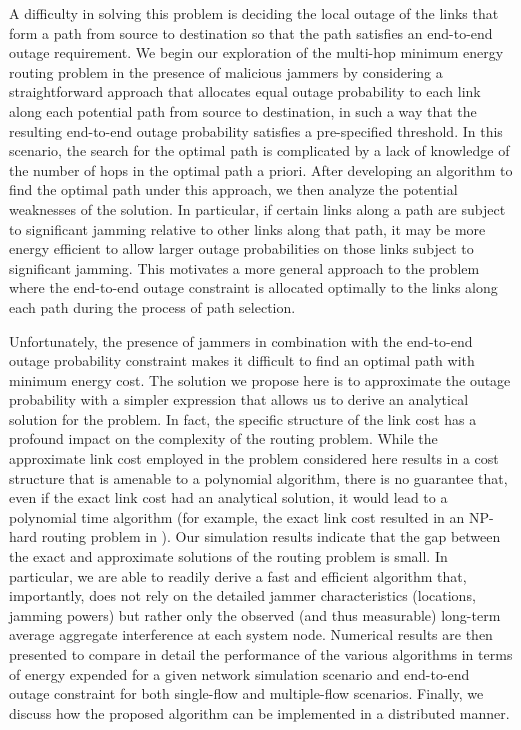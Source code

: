\documentclass[10pt,journal]{IEEEtran}
\theoremstyle{definition}
\begin{document}
A difficulty in solving this problem is deciding the local outage of
the links that form a path from source to destination so that the
path satisfies an end-to-end outage requirement. 
We begin our exploration of the multi-hop minimum energy routing problem in the presence of malicious jammers by considering a straightforward approach that allocates equal outage probability to each link along each potential path from source to destination, in such a way that the resulting end-to-end outage probability satisfies a pre-specified threshold.  In this scenario, the search for the optimal path is complicated by a lack of knowledge of the number of hops in the optimal path a priori.  After developing an algorithm to find the optimal path under this approach, we then analyze the potential weaknesses of the solution.  
In particular, if certain links along a path are subject to significant jamming relative to other links along that path, it may be more energy efficient to allow larger outage probabilities on those links subject to significant jamming.  
This motivates a more general approach to the problem where the end-to-end outage constraint is allocated optimally to the links along each path during the process of path selection.  

Unfortunately, the presence of jammers in combination with the end-to-end outage probability constraint makes it difficult to find an optimal path with minimum energy cost.  
{The solution we propose here is to approximate the outage probability
with a simpler expression that allows us to derive an analytical solution for the problem. In fact, the
specific structure of the link cost has a profound impact on the complexity of the routing problem. While the approximate link cost employed in the problem considered here results in a cost structure that is amenable to a polynomial
algorithm, there is no guarantee that, even if the exact link cost had an analytical solution, it would lead
to a polynomial time algorithm (for example, the exact link cost resulted in an NP-hard routing problem
in \cite{ghaderi2014min}). Our simulation results indicate that the gap between the exact and approximate solutions of the routing problem is small.}
In particular, we are able to readily derive a fast and efficient algorithm that, importantly, does not rely on the detailed jammer characteristics (locations, jamming powers) but rather only the observed (and thus measurable) long-term average aggregate interference at each system node. 
 Numerical results are then presented to compare in detail the performance of the various algorithms in terms of energy expended for a given network simulation scenario and end-to-end outage constraint for both single-flow and multiple-flow scenarios. Finally, we discuss how   the proposed algorithm can be implemented in a distributed manner.
 
\end{document}
